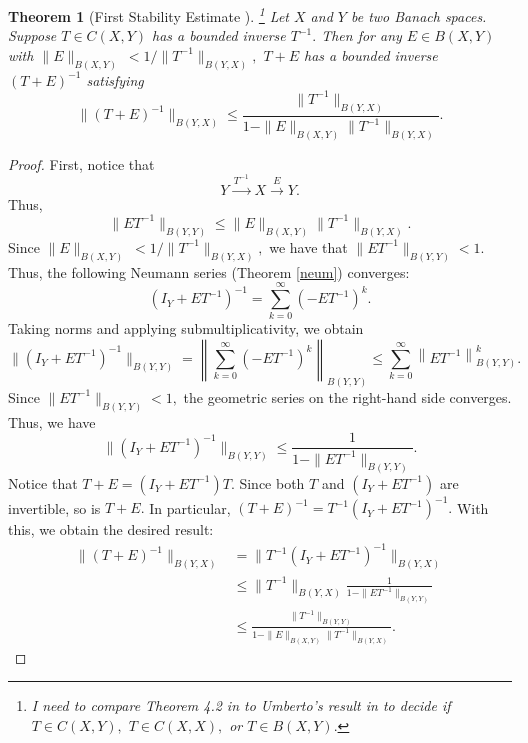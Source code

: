 \documentclass[12pt,a4paper]{article}
\theoremstyle{boldthm}
\newtheorem{theorem}{Theorem}[section]
\theoremstyle{bolddefn}
\begin{document}
\begin{theorem}[First Stability Estimate \cite{Nick}]\label{first stabilit}\footnote{I need to compare Theorem 4.2 in \cite{Nick} to Umberto's result in \cite{umberto} to decide if $T \in C(X, Y),$ $T \in C(X, X),$ or $T \in B(X, Y).$}
    Let $X$ and $Y$ be two Banach spaces. Suppose $T \in C(X, Y)$ has a bounded inverse $T^{-1}.$ Then for any $E \in B(X, Y)$ with $\| E \|_{B(X, Y)} \ < 1 / \| T^{-1} \|_{B(Y, X)},$ $T + E$ has a bounded inverse $(T + E)^{-1}$ satisfying 
    \begin{equation}
        \| (T + E)^{-1} \|_{B(Y, X)} \le \frac{\|T^{-1}\|_{B(Y, X)}} { 1 - \| E \|_{B(X, Y)} \| T^{-1}\|_{B(Y, X)}}.
    \end{equation}
\end{theorem}
\begin{proof}
    First, notice that
    \begin{equation}
        Y \xrightarrow{\,T^{-1}\,} X \xrightarrow{\,E\,} Y.
    \end{equation}
    Thus,
    \begin{equation}
        \| E T^{-1} \|_{B(Y, Y)} \le \| E \|_{B(X, Y)} \|T^{-1}\|_{B(Y, X)}.
    \end{equation}
Since $\| E \|_{B(X, Y)} \ < 1 / \| T^{-1} \|_{B(Y, X)},$ we have that $\| E T^{-1} \|_{B(Y, Y)} < 1.$ Thus, the following Neumann series (Theorem \ref{neum}) converges:
\begin{equation}
    (I_Y + E T^{-1})^{-1} = \sum_{k=0}^{\infty} (- E T^{-1})^k.
\end{equation}
Taking norms and applying submultiplicativity, we obtain
\begin{equation}
    \| (I_Y + ET^{-1})^{-1} \|_{B(Y, Y)} = \left\| \sum_{k=0}^{\infty} (- E T^{-1})^k \right\|_{B(Y, Y)} \le \sum_{k=0}^{\infty} \left\|  E T^{-1} \right\|_{B(Y, Y)}^{k}.
\end{equation}
Since $\|E T^{-1} \|_{B(Y, Y)} < 1,$ the geometric series on the right-hand side converges. Thus, we have
\begin{equation}
    \| (I_Y + ET^{-1})^{-1} \|_{B(Y, Y)}  \le \frac{1}{1 - \|E T^{-1}\|_{B(Y, Y)}}.
\end{equation}
Notice that $T + E = (I_Y + ET^{-1})T.$ Since both $T$ and $(I_Y + ET^{-1})$ are invertible, so is $T + E.$ In particular, $(T + E)^{-1} = T^{-1} (I_Y + ET^{-1})^{-1}.$ With this, we obtain the desired result:
\begin{equation}
\begin{aligned}
    \| (T + E)^{-1} \|_{B(Y, X)} 
    &= \| T^{-1} (I_Y + ET^{-1})^{-1} \|_{B(Y, X)} \\
    & \le \|T^{-1} \|_{B(Y, X)}  \frac{1}{1 - \|E T^{-1}\|_{B(Y, Y)}} \\
    & \le \frac{\|T^{-1}\|_{B(Y, Y)}} { 1 - \| E \|_{B(X, Y)} \| T^{-1}\|_{B(Y, X)}}.
\end{aligned}
\end{equation}
\end{proof}
\end{document}
